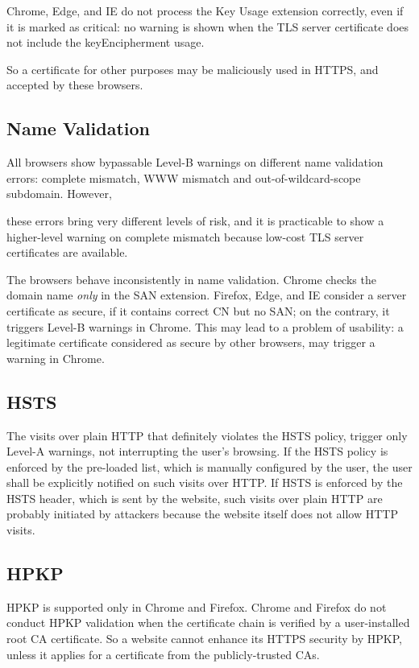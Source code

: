Chrome, Edge, and IE do not process the Key Usage extension correctly,
    even if it is marked as critical:
no warning is shown when the TLS server certificate does not include the keyEncipherment usage.

So a certificate for other purposes may be maliciously used in HTTPS, and accepted by these browsers.


\subsection{Name Validation}

All browsers show bypassable Level-B warnings on different name validation errors:
complete mismatch,
WWW mismatch and out-of-wildcard-scope subdomain.
However,

    these errors bring very different levels of risk,
    and it is practicable to show a higher-level warning on complete mismatch
     because low-cost TLS server certificates are available.


The browsers behave inconsistently in name validation.
Chrome checks the domain name \emph{only} in the SAN extension.
Firefox, Edge, and IE consider a server certificate as secure,
    if it contains correct CN but no SAN;
    on the contrary, it triggers Level-B warnings in Chrome.
This may lead to a problem of usability:
    a legitimate certificate considered as secure by other browsers,
    may trigger a warning in Chrome.



\subsection{HSTS}
The visits over plain HTTP that definitely violates the HSTS policy,
 trigger only Level-A warnings, not interrupting the user's browsing.
If the HSTS policy is enforced by the pre-loaded list, which is manually configured by the user,
    the user shall be explicitly notified on such visits over HTTP.
If HSTS is enforced  by the HSTS header, which is sent by the website,
    such visits over plain HTTP are probably initiated by attackers because the website itself does not allow HTTP visits.

\subsection{HPKP}
HPKP is supported only in Chrome and Firefox.
        Chrome and Firefox do not conduct HPKP validation
            when the certificate chain is verified by a user-installed root CA certificate.
So a website cannot enhance its HTTPS security by HPKP,
    unless it applies for a certificate from the publicly-trusted CAs.


